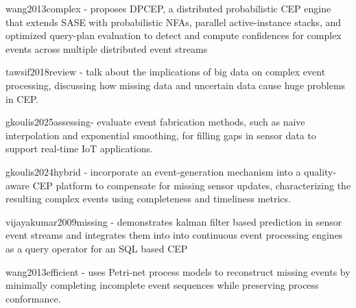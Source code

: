 wang2013complex - proposes DPCEP, a distributed probabilistic CEP engine that extends SASE with probabilistic NFAs, parallel active-instance stacks, and optimized query-plan evaluation to detect and compute confidences for complex events across multiple distributed event streams

tawsif2018review - talk about the implications of big data on complex event processing, discussing how missing data and uncertain data cause huge problems in CEP.

gkoulis2025assessing-  evaluate event fabrication methods, such as naive interpolation and exponential smoothing, for filling gaps in sensor data to support real-time IoT applications.

gkoulis2024hybrid - incorporate an event-generation mechanism into a quality-aware CEP platform to compensate for missing sensor updates, characterizing the resulting complex events using completeness and timeliness metrics. 

vijayakumar2009missing - demonstrates kalman filter based prediction in sensor event streams and integrates them into into continuous event processing engines as a query operator for an SQL based CEP

wang2013efficient - uses Petri-net process models to reconstruct missing events by minimally completing incomplete event sequences while preserving process conformance.
